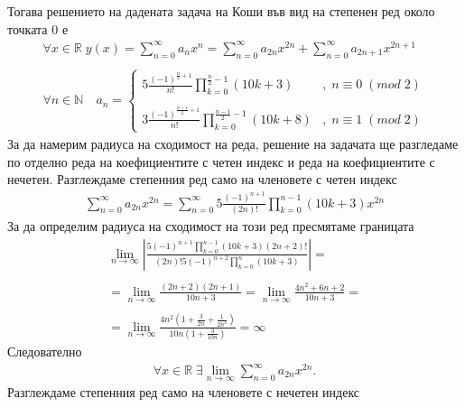 \documentclass[a4paper,14pt]{extarticle}
\newcommand{\R}{\mathbb{R}}
\newcommand{\N}{\mathbb{N}}
\begin{document}
Тогава решението на дадената задача на Коши във вид на степенен ред около точката $0$ е
\begin{align*}
    \forall x \in \R \; y(x) = \displaystyle\sum_{n = 0}^\infty a_n x^n = \displaystyle\sum_{n = 0}^\infty a_{2n} x^{2n} + \displaystyle\sum_{n = 0}^\infty a_{2n + 1} x^{2n + 1} \\\\
    \forall n \in \N \quad a_n = \begin{cases}
        5\displaystyle\frac{(-1)^{\frac{n}{2} + 1}}{n!}\displaystyle\prod_{k = 0}^{\frac{n}{2} - 1}(10k + 3) &, \; n \equiv 0 \; (mod \; 2) \\\\
        3\displaystyle\frac{(-1)^{\frac{n - 1}{2} + 1}}{n!}\displaystyle\prod_{k = 0}^{\frac{n - 1}{2} - 1}(10k + 8) &, \; n \equiv 1 \; (mod \; 2)
    \end{cases}
\end{align*}
За да намерим радиуса на сходимост на реда, решение на задачата ще разгледаме по отделно реда на коефициентите с четен индекс и реда на коефициентите с нечетен.
Разглеждаме степенния ред само на членовете с четен индекс
\begin{align*}
    \displaystyle\sum_{n = 0}^\infty a_{2n} x^{2n} = \displaystyle\sum_{n = 0}^\infty 5\frac{(-1)^{n + 1}}{(2n)!}\displaystyle\prod_{k = 0}^{n - 1}(10k + 3) x^{2n}
\end{align*}
За да определим радиуса на сходимост на този ред пресмятаме границата
\begin{align*}
    \displaystyle\lim_{n \to \infty} \left|\displaystyle\frac{5(-1)^{n + 1}\displaystyle\prod_{k = 0}^{n - 1}(10k + 3)(2n + 2)!}{(2n)!5(-1)^{n + 2}\displaystyle\prod_{k = 0}^{n}(10k + 3)}\right| = \\\\
    = \displaystyle\lim_{n \to \infty} \displaystyle\frac{(2n + 2)(2n + 1)}{10n + 3} = \displaystyle\lim_{n \to \infty} \displaystyle\frac{4n^2 + 6n + 2}{10n + 3} = \\\\
    = \displaystyle\lim_{n \to \infty} \displaystyle\frac{4n^2\left(1 + \frac{3}{2n} + \frac{1}{2n^2}\right)}{10n\left(1 + \frac{3}{10n}\right)} = \infty
\end{align*}
Следователно
\begin{align*}
    \forall x \in \R \; \exists \displaystyle\lim_{n \to \infty}\displaystyle\sum_{n = 0}^\infty a_{2n} x^{2n}.
\end{align*}
Разглеждаме степенния ред само на членовете с нечетен индекс
\end{document}
